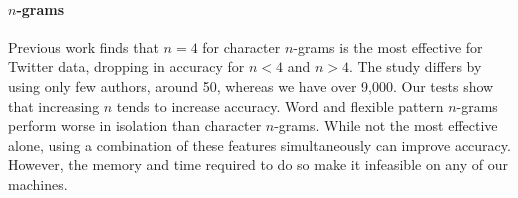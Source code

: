 \documentclass[twocolumn,10pt]{article}
\begin{document}
\paragraph{$n$-grams}
Previous work finds that $n=4$ for character $n$-grams is the most effective for Twitter data\supercite{layton2010authorship}, dropping in accuracy for $n<4$ and $n>4$. 
The study differs by using only few authors, around 50, whereas we have over 9,000. 
Our tests show that increasing $n$ tends to increase accuracy. 
Word and flexible pattern $n$-grams perform worse in isolation than character $n$-grams. %
While not the most effective alone, using a combination of these features simultaneously can improve accuracy\supercite{rocha2016authorship}.
However, the memory and time required to do so make it infeasible on any of our machines. 
\end{document}
